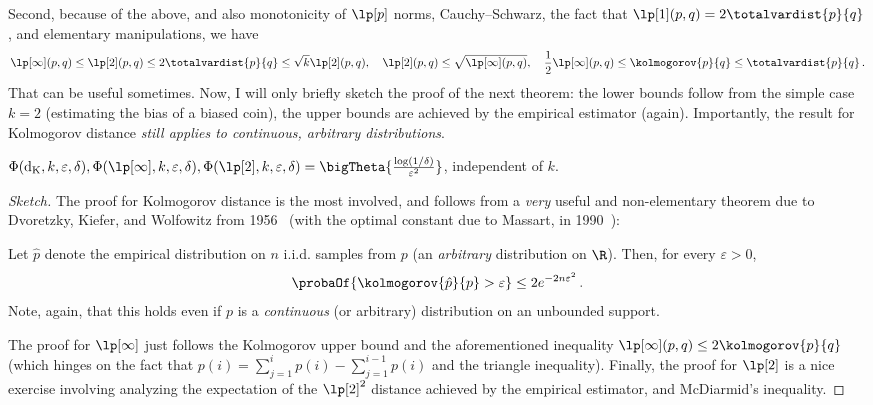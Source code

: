 \documentclass[10pt]{article}
\newcommand{\dst}{\varepsilon}
\newcommand{\ab}{k}
\newcommand{\ns}{n}
\begin{document}
Second, because of the above, and also monotonicity of $\lp[p]$ norms, Cauchy--Schwarz, the fact that $\lp[1](p,q) = 2\totalvardist{p}{q}$, and elementary manipulations, we have
\[
    \lp[\infty](p,q)\leq \lp[2](p,q)\leq 2\totalvardist{p}{q} \leq \sqrt{\ab}\lp[2](p,q), \quad 
    \lp[2](p,q)\leq \sqrt{\lp[\infty](p,q)}, \quad  \frac{1}{2}\lp[\infty](p,q)\leq \kolmogorov{p}{q} \leq \totalvardist{p}{q}\,.
\]
That can be useful sometimes. Now, I will only briefly sketch the proof of the next theorem: the lower bounds follow from the simple case $\ab=2$ (estimating the bias of a biased coin), the upper bounds are achieved by the empirical estimator (again). Importantly, the result for Kolmogorov distance \emph{still applies to continuous, arbitrary distributions}.
\begin{theorem}\label{theo:learning:kolmogorov}
  $\Phi(\operatorname{d_{\rm{}K}},\ab,\dst,\delta),\Phi(\lp[\infty],\ab,\dst,\delta),\Phi(\lp[2],\ab,\dst,\delta) = \bigTheta{\frac{\log(1/\delta)}{\dst^2}}$, independent of $\ab$.
\end{theorem}
\begin{proof}[Sketch]
The proof for Kolmogorov distance is the most involved, and follows from a \emph{very} useful and non-elementary theorem due to Dvoretzky, Kiefer, and Wolfowitz from 1956~\cite{DKW:56} (with the optimal constant due to Massart, in 1990~\cite{Massart:90}):
\begin{theorem}
  Let $\hat{p}$ denote the empirical distribution on $\ns$ i.i.d. samples from $p$ (an \emph{arbitrary} distribution on $\R$). Then, for every $\dst > 0$,
  \[
      \probaOf{ \kolmogorov{\hat{p}}{p} > \dst } \leq 2e^{-2\ns \dst^2 }\,.
  \]
  Note, again, that this holds even if $p$ is a \emph{continuous} (or arbitrary) distribution on an unbounded support.
\end{theorem}
The proof for $\lp[\infty]$ just follows the Kolmogorov upper bound and the aforementioned inequality $\lp[\infty](p,q) \leq 2\kolmogorov{p}{q}$ (which hinges on the fact that $p(i) = \sum_{j=1}^i p(i) - \sum_{j=1}^{i-1} p(i)$ and the triangle inequality). Finally, the proof for $\lp[2]$ is a nice exercise involving analyzing the expectation of the $\lp[2]^2$ distance achieved by the empirical estimator, and McDiarmid's inequality.
\end{proof}
\end{document}
